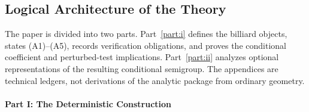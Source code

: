 \documentclass[12pt, letterpaper]{amsart}
\theoremstyle{plain}
\theoremstyle{definition}
\theoremstyle{remark}
\begin{document}
\subsection{Logical Architecture of the Theory}
The paper is divided into two parts. Part~\ref{part:i} defines the billiard
objects, states \textup{(A1)--(A5)}, records verification obligations, and proves
the conditional coefficient and perturbed-test implications. Part~\ref{part:ii}
analyzes optional representations of the resulting conditional semigroup. The
appendices are technical ledgers, not derivations of the analytic package from
ordinary geometry.


\paragraph{\bfseries Part I: The Deterministic Construction}
\end{document}
